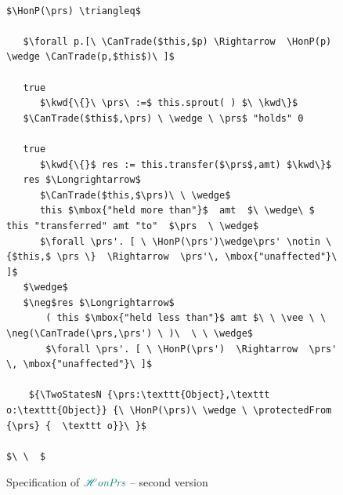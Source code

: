 \documentclass[acmsmall,review,anonymous,screen]{acmart}\settopmatter{printfolios=true,printacmref=false}
\begin{document}
 \begin{figure}[t]
\begin{lstlisting}[mathescape=true, language=Chainmail,frame=lines]

$\HonP(\prs) \triangleq$   

   $\forall p.[\ \CanTrade($this,$p) \Rightarrow  \HonP(p) \wedge \CanTrade(p,$this$)\ ]$
   
   true
      $\kwd{\{}\ \prs\ :=$ this.sprout( ) $\ \kwd\}$
   $\CanTrade($this$,\prs) \ \wedge \ \prs$ "holds" 0  
  
   true
      $\kwd{\{}$ res := this.transfer($\prs$,amt) $\kwd\}$
   res $\Longrightarrow$
      $\CanTrade($this,$\prs)\ \ \wedge$ 
      this $\mbox{"held more than"}$  amt  $\ \wedge\ $ this "transferred" amt "to"  $\prs  \ \wedge$     
      $\forall \prs'. [ \ \HonP(\prs')\wedge\prs' \notin \{$this,$ \prs \}  \Rightarrow  \prs'\, \mbox{"unaffected"}\ ]$                 
   $\wedge$
   $\neg$res $\Longrightarrow$
       ( this $\mbox{"held less than"}$ amt $\ \ \vee \ \  \neg(\CanTrade(\prs,\prs') \ )\  \ \ \wedge$
       $\forall \prs'. [ \ \HonP(\prs')  \Rightarrow  \prs' \, \mbox{"unaffected"}\ ]$ 

    ${\TwoStatesN {\prs:\texttt{Object},\texttt o:\texttt{Object}} {\ \HonP(\prs)\ \wedge \ \protectedFrom {\prs} {  \texttt o}}\ }$

$\ \  $

\end{lstlisting}
\caption{Specification of $\textcolor{teal}{{\mathcal H}{\textit{onPrs}}}$ -- second version}
\label{fig:PurseSpec}
 \end{figure}

  
\end{document}
